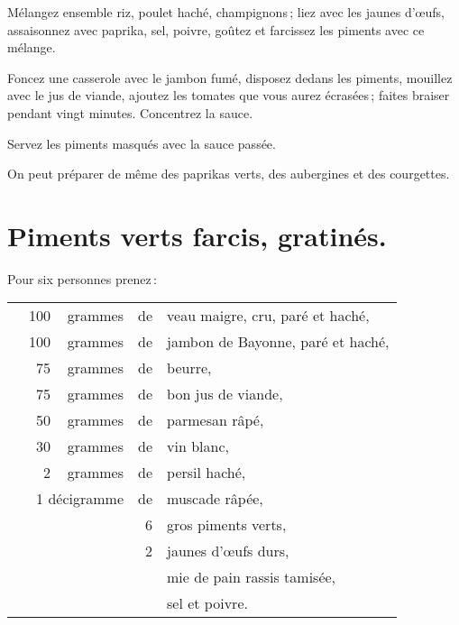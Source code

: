 Mélangez ensemble riz, poulet haché, champignons ; liez avec les jaunes d'œufs,
assaisonnez avec paprika, sel, poivre, goûtez et farcissez les piments avec ce
mélange.

Foncez une casserole avec le jambon fumé, disposez dedans les piments, mouillez
avec le jus de viande, ajoutez les tomates que vous aurez écrasées ; faites
braiser pendant vingt minutes. Concentrez la sauce.

Servez les piments masqués avec la sauce passée.

\sk

On peut préparer de même des paprikas verts, des aubergines et des courgettes.

\section*{\centering Piments verts farcis, gratinés.}
{}

Pour six personnes prenez :

\footnotesize
\begin{longtable}{rrrrp{16em}}
  &     100 & grammes & de & veau maigre, cru, paré et haché,                                             \\
  &     100 & grammes & de & jambon de Bayonne, paré et haché,                                            \\
  &      75 & grammes & de & beurre,                                                                      \\
  &      75 & grammes & de & bon jus de viande,                                                           \\
  &      50 & grammes & de & parmesan râpé,                                                               \\
  &      30 & grammes & de & vin blanc,                                                                   \\
  &       2 & grammes & de & persil haché,                                                                \\
  & \multicolumn{2}{r}{1 décigramme} & de & muscade râpée,                                                \\
  &         &         &  6 & gros piments verts,                                                          \\
  &         &         &  2 & jaunes d'œufs durs,                                                          \\
  &         &         &    & mie de pain rassis tamisée,                                                  \\
  &         &         &    & sel et poivre.                                                               \\
\end{longtable}
\normalsize

